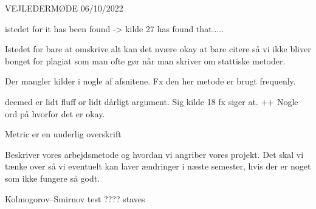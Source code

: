 









VEJLEDERMØDE 06/10/2022

istedet for it has been found -> kilde 27 has found that.....

Istedet for bare at omskrive alt kan det nvære okay at bare citere så vi ikke bliver bonget for plagiat som man ofte gør når man skriver om stattiske metoder. 

Der mangler kilder i nogle af afsnitene. Fx den her metode er brugt frequenly. 

deemed er lidt fluff or lidt dårligt argument. Sig kilde 18 fx siger at. ++ Nogle ord på hvorfor det er okay. 

Metric er en underlig overskrift

Beskriver vores arbejdsmetode og hvordan vi angriber vores projekt. Det skal vi tænke over så vi eventuelt kan laver ændringer i næste semester, hvis der er noget som ikke fungere så godt.

Kolmogorov–Smirnov test ???? staves

